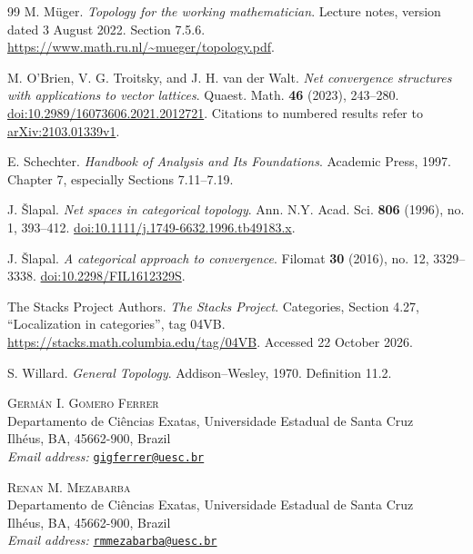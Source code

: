 \documentclass[11pt,a4paper]{article}
\theoremstyle{definition}
\theoremstyle{remark}
\begin{document}
\begin{thebibliography}{99}
M. M\"uger. \emph{Topology for the working mathematician}.
Lecture notes, version dated 3 August 2022. Section 7.5.6.
\url{https://www.math.ru.nl/~mueger/topology.pdf}.


M. O'Brien, V. G. Troitsky, and J. H. van der Walt.
\emph{Net convergence structures with applications to vector lattices}.
Quaest. Math. \textbf{46} (2023), 243--280.
\href{https://doi.org/10.2989/16073606.2021.2012721}{doi:10.2989/16073606.2021.2012721}.
Citations to numbered results refer to \href{https://arxiv.org/abs/2103.01339v1}{arXiv:2103.01339v1}.

E. Schechter. \emph{Handbook of Analysis and Its Foundations}.
Academic Press, 1997. Chapter 7, especially Sections 7.11--7.19.

J. \v{S}lapal. \emph{Net spaces in categorical topology}.
Ann. N.Y. Acad. Sci. \textbf{806} (1996), no. 1, 393--412.
\href{https://doi.org/10.1111/j.1749-6632.1996.tb49183.x}{doi:10.1111/j.1749-6632.1996.tb49183.x}.

J. \v{S}lapal. \emph{A categorical approach to convergence}.
Filomat \textbf{30} (2016), no. 12, 3329--3338.
\href{https://doi.org/10.2298/FIL1612329S}{doi:10.2298/FIL1612329S}.

The Stacks Project Authors. \emph{The Stacks Project}.
Categories, Section 4.27, ``Localization in categories'', tag 04VB.
\url{https://stacks.math.columbia.edu/tag/04VB}. Accessed 22 October 2026.

S. Willard. \emph{General Topology}. Addison--Wesley, 1970.
Definition 11.2.
\end{thebibliography}

\bigskip
\noindent\begin{minipage}{\textwidth}
\small
\textsc{Germ\'an I. Gomero Ferrer}\\
Departamento de Ci\^encias Exatas, Universidade Estadual de Santa Cruz\\
Ilh\'eus, BA, 45662-900, Brazil\\
\textit{Email address:} \href{mailto:gigferrer@uesc.br}{\nolinkurl{gigferrer@uesc.br}}
\end{minipage}

\medskip
\noindent\begin{minipage}{\textwidth}
\small
\textsc{Renan M. Mezabarba}\\
Departamento de Ci\^encias Exatas, Universidade Estadual de Santa Cruz\\
Ilh\'eus, BA, 45662-900, Brazil\\
\textit{Email address:} \href{mailto:rmmezabarba@uesc.br}{\nolinkurl{rmmezabarba@uesc.br}}
\end{minipage}
\end{document}
